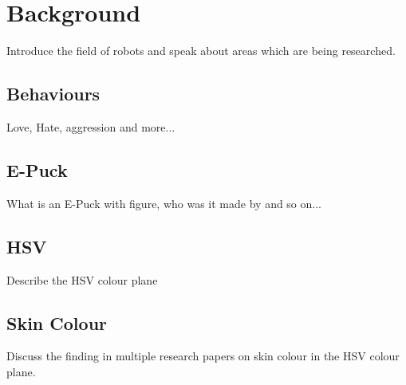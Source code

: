\section{Background} \label{sec:background}
Introduce the field of robots and speak about areas which are being researched.
\subsection{Behaviours}
Love, Hate, aggression and more...
\subsection{E-Puck}
What is an E-Puck with figure, who was it made by and so on...
\subsection{HSV}
Describe the HSV colour plane
\subsection{Skin Colour}
Discuss the finding in multiple research papers on skin colour in the HSV colour plane.
